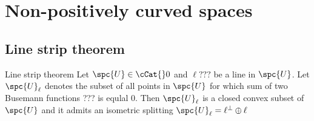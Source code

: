 \chapter{Non-positively curved spaces}

\section{Line strip theorem}

\begin{thm}{Line strip theorem}\label{split=<0}
Let $\spc{U}\in\cCat{}0$ and $\ell???$ be a line in $\spc{U}$.
Let $\spc{U}_\ell$ denotes the subset of all points in $\spc{U}$ for which sum of two Busemann functions ??? is equlal $0$.
Then $\spc{U}_\ell$ is a closed convex subset of $\spc{U}$ and it admits an isometric splitting $\spc{U}_\ell=\ell^\perp\oplus\ell$
\end{thm}
